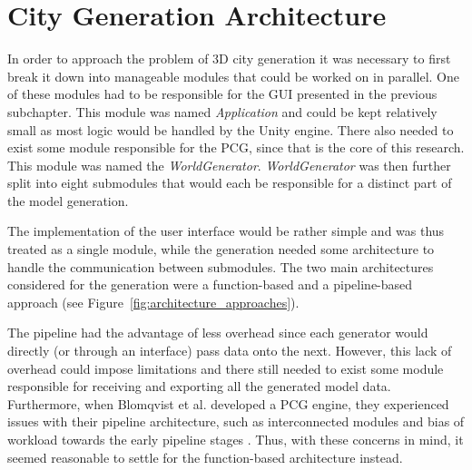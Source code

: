 \section{City Generation Architecture}
\label{sec:city-gen-arch}

In order to approach the problem of 3D city generation it was necessary to first break it down into manageable modules that could be worked on in parallel.
One of these modules had to be responsible for the GUI presented in the previous subchapter.
This module was named \textit{Application} and could be kept relatively small as most logic would be handled by the Unity engine.
There also needed to exist some module responsible for the PCG, since that is the core of this research.
This module was named the \textit{WorldGenerator}.
\textit{WorldGenerator} was then further split into eight submodules that would each be responsible for a distinct part of the model generation.

The implementation of the user interface would be rather simple and was thus treated as a single module, while the generation needed some architecture to handle the communication between submodules.
The two main architectures considered for the generation were a function-based and a pipeline-based approach (see Figure~\ref{fig:architecture_approaches}).

The pipeline had the advantage of less overhead since each generator would directly (or through an interface) pass data onto the next.
However, this lack of overhead could impose limitations and there still needed to exist some module responsible for receiving and exporting all the generated model data.
Furthermore, when Blomqvist et al. developed a PCG engine, they experienced issues with their pipeline architecture, such as interconnected modules and bias of workload towards the early pipeline stages \cite[p. 45]{ba_landscape}.
Thus, with these concerns in mind, it seemed reasonable to settle for the function-based architecture instead.

